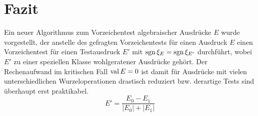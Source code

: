 %
%
\vfill
\section{Fazit}

Ein neuer Algorithmus zum Vorzeichentest 
algebraischer Ausdrücke $E$ wurde vorgestellt,
der anstelle des gefragten Vorzeichentests
für einen Ausdruck $E$ einen Vorzeichentest
für einen Testausdruck $E'$ mit $\operatorname{sgn}\xi_E=\operatorname{sgn}\xi_{E'}$
durchführt, wobei $E'$ zu einer speziellen Klasse
wohlgeratener Ausdrücke gehört.
Der Rechenaufwand im kritischen Fall $\mathop{\rm val}\nolimits E=0$ ist damit
für Ausdrücke mit vielen unterschiedlichen Wurzeloperationen 
drastisch reduziert 
bzw. derartige Tests sind überhaupt erst praktikabel.
\vfill
$$E' = \frac{E_0-E_1}{|E_0|+|E_1|}$$
\vfill

%
%
